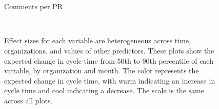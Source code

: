 \documentclass[manuscript,screen,review]{acmart}
\begin{document}
\begin{figure}
\begin{minipage}{0.33\linewidth}
{}


\end{minipage}%
%
\begin{minipage}{0.33\linewidth}



\end{minipage}%
%
\begin{minipage}{0.17\linewidth}
~\end{minipage}%
\newline
\begin{minipage}{0.17\linewidth}
~\end{minipage}%
%
\begin{minipage}{0.33\linewidth}
Comments per PR\end{minipage}%
%
\begin{minipage}{0.17\linewidth}
~\end{minipage}%

\caption{\label{fig-heatmaps}Effect sizes for each variable are
heterogeneous across time, organizations, and values of other
predictors. These plots show the expected change in cycle time from 50th
to 90th percentile of each variable, by organization and month. The
color represents the expected change in cycle time, with warm indicating
an increase in cycle time and cool indicating a decrease. The scale is
the same across all plots.}

\end{figure}%
\end{document}
